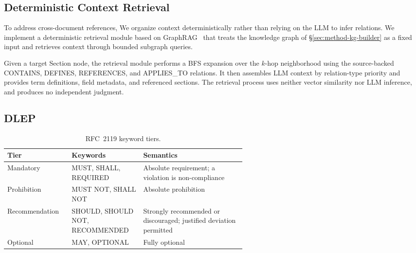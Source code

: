 \subsection{Deterministic Context Retrieval}
\label{sec:method-graphrag}

To address cross-document references, We organize context deterministically rather than relying on the LLM to infer relations.
We implement a deterministic retrieval module based on GraphRAG~\cite{edge2024local} that treats the knowledge graph of \S\ref{sec:method-kg-builder} as a fixed input and retrieves context through bounded subgraph queries.

Given a target Section node, the retrieval module performs a BFS expansion over the $k$-hop neighborhood using the source-backed CONTAINS, DEFINES, REFERENCES, and APPLIES\_TO relations.
It then assembles LLM context by relation-type priority and provides term definitions, field metadata, and referenced sections. The retrieval process uses neither vector similarity nor LLM inference, and produces no independent judgment.

\subsection{DLEP}
\label{sec:method-dual-layer}

\begin{table}[tb]
\centering
\caption{RFC~2119 keyword tiers.}
\label{tab:rfc2119}
\setlength{\tabcolsep}{4pt}
\footnotesize
\begin{tabularx}{\columnwidth}{@{}L{0.27\linewidth} L{0.30\linewidth} X@{}}
\toprule
Tier & Keywords & Semantics \\
\midrule
Mandatory      & MUST, SHALL, REQUIRED   & Absolute requirement; a violation is non-compliance \\
Prohibition    & MUST NOT, SHALL NOT     & Absolute prohibition \\
Recommendation & SHOULD, SHOULD NOT, RECOMMENDED & Strongly recommended or discouraged; justified deviation permitted \\
Optional       & MAY, OPTIONAL           & Fully optional \\
\bottomrule
\end{tabularx}
\end{table}

